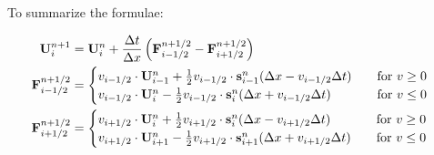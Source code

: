 To summarize the formulae:

\begin{align*}
	\mathbf{U}_i ^{n+1} &= 
		\mathbf{U}_i^{n} +  \frac{\Delta t}{\Delta x} \left( \mathbf{F}_{i-1/2}^{n+1/2} - \mathbf{F}_{i+1/2}^{n+1/2} \right) & \\
	\mathbf{F}_{i-1/2}^{n+1/2} &= 
		\begin{cases}
			v_{i-1/2} \cdot \mathbf{U}_{i-1}^n +  \frac{1}{2} v_{i-1/2} \cdot\mathbf{s}_{i-1}^n (\Delta x -  v_{i-1/2} \Delta t)
			 	& \quad \text{for } v \geq 0 \\
			v_{i-1/2} \cdot \mathbf{U}_{i}^n -\frac{1}{2} v_{i-1/2} \cdot \mathbf{s}_{i}^n (\Delta x + v_{i-1/2} \Delta t)
				& \quad \text{for } v \leq 0 \\
		\end{cases} \\
	\mathbf{F}_{i+1/2}^{n+1/2} &= 
		\begin{cases}
			v_{i+1/2} \cdot \mathbf{U}_{i}^n +  \frac{1}{2} v_{i+1/2} \cdot\mathbf{s}_{i}^n (\Delta x -  v_{i+1/2} \Delta t)
			 	& \quad \text{for } v \geq 0 \\
			v_{i+1/2} \cdot \mathbf{U}_{i+1}^n -\frac{1}{2} v_{i+1/2} \cdot \mathbf{s}_{i+1}^n (\Delta x + v_{i+1/2} \Delta t)
				& \quad \text{for } v \leq 0 \\
		\end{cases} \\		
\end{align*}





